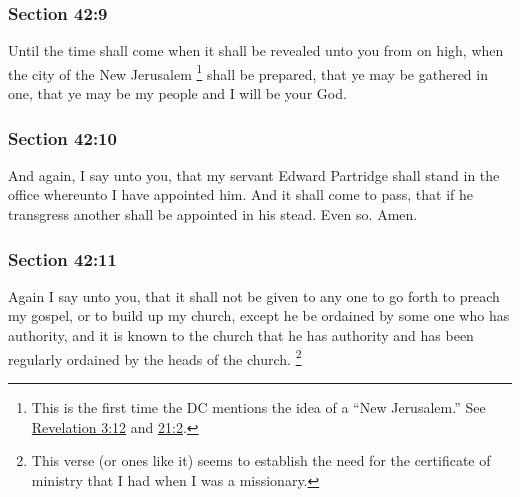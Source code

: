 	\subsubsection{Section 42:9} %
		\label{DC42-9}

		Until the time shall come when it shall be revealed unto you from on high, when the city of the New Jerusalem%
			\footnote{%
				This is the first time the DC mentions the idea of a ``New Jerusalem.'' See \hyperref[REVELATIONNT-3-12]{Revelation 3:12} and \hyperref[REVELATIONNT-21-2]{21:2}.
				}
		shall be prepared, that ye may be gathered in one, that ye may be my people and I will be your God.


	\subsubsection{Section 42:10} %
		\label{DC42-10}

		And again, I say unto you, that my servant Edward Partridge shall stand in the office whereunto I have appointed him.  And it shall come to pass, that if he transgress another shall be appointed in his stead.  Even so.  Amen.


	\subsubsection{Section 42:11} %
		\label{DC42-11}

		Again I say unto you, that it shall not be given to any one to go forth to preach my gospel, or to build up my church, except he be ordained by some one who has authority, and it is known to the church that he has authority and has been regularly ordained by the heads of the church.%
			\footnote{%
				This verse (or ones like it) seems to establish the need for the certificate of ministry that I had when I was a missionary.
				}

